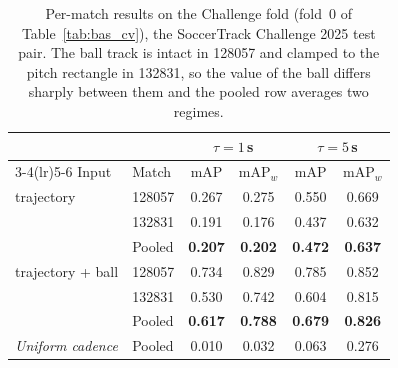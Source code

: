 \begin{table}[t]
  \centering
  \caption{Per-match results on the Challenge fold (fold~0 of Table~\ref{tab:bas_cv}), the SoccerTrack Challenge 2025 test pair. The ball track is intact in 128057 and clamped to the pitch rectangle in 132831, so the value of the ball differs sharply between them and the pooled row averages two regimes.}
  \label{tab:bas_results}
  \small
  \begin{tabular}{llcccc}
    \toprule
    & & \multicolumn{2}{c}{$\tau = 1\,$s} & \multicolumn{2}{c}{$\tau = 5\,$s} \\
    \cmidrule(lr){3-4}\cmidrule(lr){5-6}
    Input & Match & mAP & mAP$_w$ & mAP & mAP$_w$ \\
    \midrule
    trajectory & 128057 & 0.267 & 0.275 & 0.550 & 0.669 \\
     & 132831 & 0.191 & 0.176 & 0.437 & 0.632 \\
     & Pooled & \textbf{0.207} & \textbf{0.202} & \textbf{0.472} & \textbf{0.637} \\
    \midrule
    trajectory + ball & 128057 & 0.734 & 0.829 & 0.785 & 0.852 \\
     & 132831 & 0.530 & 0.742 & 0.604 & 0.815 \\
     & Pooled & \textbf{0.617} & \textbf{0.788} & \textbf{0.679} & \textbf{0.826} \\
    \midrule
    \textit{Uniform cadence} & Pooled & 0.010 & 0.032 & 0.063 & 0.276 \\
    \bottomrule
  \end{tabular}
\end{table}

